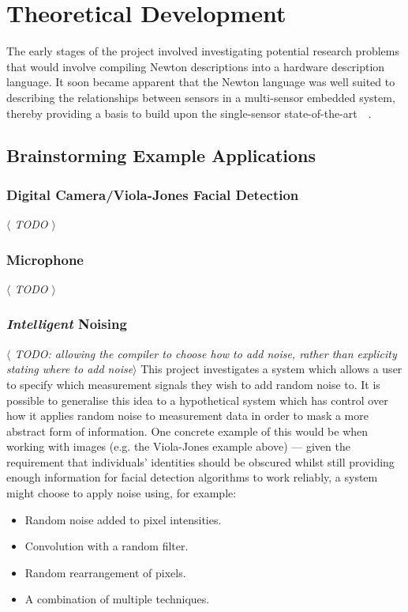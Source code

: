 \documentclass[12pt]{article}
\begin{document}
\section{Theoretical Development}
  The early stages of the project involved investigating potential research problems that would involve compiling Newton descriptions into a hardware description language. It soon became apparent that the Newton language was well suited to describing the relationships between sensors in a multi-sensor embedded system, thereby providing a basis to build upon the single-sensor state-of-the-art~\cite{Choi2018GuaranteeingLD}~\cite{diffpriv_2006}.
  \subsection{Brainstorming Example Applications}
    \subsubsection{Digital Camera/Viola-Jones Facial Detection}
      \textit{$\langle$ TODO $\rangle$}

    \subsubsection{Microphone}
      \textit{$\langle$ TODO $\rangle$}

    \subsubsection{\textit{Intelligent} Noising}
      \textit{$\langle$ TODO: allowing the compiler to choose how to add noise, rather than explicity stating where to add noise$\rangle$}
      This project investigates a system which allows a user to specify which measurement signals they wish to add random noise to. It is possible to generalise this idea to a hypothetical system which has control over how it applies random noise to measurement data in order to mask a more abstract form of information. One concrete example of this would be when working with images (e.g. the  Viola-Jones example above) --- given the requirement that individuals' identities should be obscured whilst still providing enough information for facial detection algorithms to work reliably, a system might choose to apply noise using, for example:

      \begin{itemize}
        \item Random noise added to pixel intensities.
        \item Convolution with a random filter.
        \item Random rearrangement of pixels.
        \item A combination of multiple techniques.
      \end{itemize}
\end{document}
